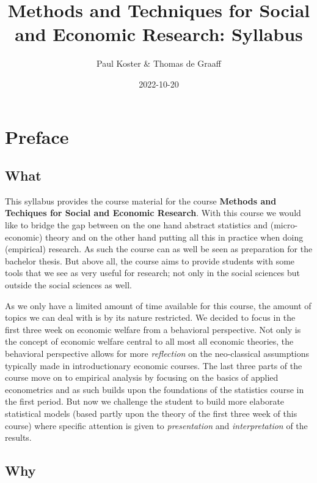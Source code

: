 \documentclass[
]{book}
\title{Methods and Techniques for Social and Economic Research: Syllabus}
\author{Paul Koster \& Thomas de Graaff}
\date{2022-10-20}
\begin{document}
\maketitle

{
\setcounter{tocdepth}{1}
\tableofcontents
}
\hypertarget{preface}{%
\chapter*{Preface}\label{preface}}

\hypertarget{what}{%
\section*{What}\label{what}}

This syllabus provides the course material for the course \textbf{Methods and Techiques for Social and Economic Research}. With this course we would like to bridge the gap between on the one hand abstract statistics and (micro-economic) theory and on the other hand putting all this in practice when doing (empirical) research. As such the course can as well be seen as preparation for the bachelor thesis. But above all, the course aims to provide students with some tools that we see as very useful for research; not only in the social sciences but outside the social sciences as well.

As we only have a limited amount of time available for this course, the amount of topics we can deal with is by its nature restricted. We decided to focus in the first three week on economic welfare from a behavioral perspective. Not only is the concept of economic welfare central to all most all economic theories, the behavioral perspective allows for more \emph{reflection} on the neo-classical assumptions typically made in introductionary economic courses. The last three parts of the course move on to empirical analysis by focusing on the basics of applied econometrics and as such builds upon the foundations of the statistics course in the first period. But now we challenge the student to build more elaborate statistical models (based partly upon the theory of the first three week of this course) where specific attention is given to \emph{presentation} and \emph{interpretation} of the results.

\hypertarget{why}{%
\section*{Why}\label{why}}
\end{document}
